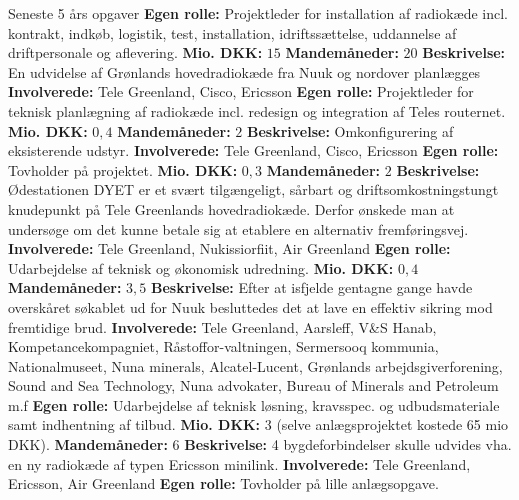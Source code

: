 \begin{rubric}{Seneste 5 års opgaver}
\entry* \textbf{Egen rolle:} Projektleder for installation af radiokæde incl. kontrakt, indkøb, logistik, test, installation, idriftssættelse, uddannelse af driftpersonale og aflevering.
\entry* \textbf{Mio. DKK:} $15$
\entry* \textbf{Mandemåneder:} $20$
%
 \textbf{Beskrivelse:} En udvidelse af Grønlands hovedradiokæde fra Nuuk og nordover planlægges
\entry* \textbf{Involverede:} Tele Greenland, Cisco, Ericsson
\entry* \textbf{Egen rolle:} Projektleder for teknisk planlægning af radiokæde incl. redesign og integration af Teles routernet.
\entry* \textbf{Mio. DKK:} $0,4$
\entry* \textbf{Mandemåneder:} $2$
%
 \textbf{Beskrivelse:} Omkonfigurering af eksisterende udstyr.
\entry* \textbf{Involverede:} Tele Greenland, Cisco, Ericsson
\entry* \textbf{Egen rolle:} Tovholder på projektet.
\entry* \textbf{Mio. DKK:} $0,3$
\entry* \textbf{Mandemåneder:} $2$
%
 \textbf{Beskrivelse:} Ødestationen DYET er et svært tilgængeligt, sårbart og driftsomkostningstungt knudepunkt på Tele Greenlands hovedradiokæde. Derfor ønskede man at undersøge om det kunne betale sig at etablere en alternativ fremføringsvej.
\entry* \textbf{Involverede:} Tele Greenland, Nukissiorfiit, Air Greenland
\entry* \textbf{Egen rolle:} Udarbejdelse af teknisk og økonomisk udredning.
\entry* \textbf{Mio. DKK:} $0,4$
\entry* \textbf{Mandemåneder:} $3,5$
%
 \textbf{Beskrivelse:} Efter at isfjelde gentagne gange havde overskåret søkablet ud for Nuuk besluttedes det at lave en effektiv sikring mod fremtidige brud.
\entry* \textbf{Involverede:} Tele Greenland, Aarsleff, V\&S Hanab, Kompetancekompagniet, Råstoffor-valtningen, Sermersooq kommunia, Nationalmuseet, Nuna minerals, Alcatel-Lucent, Grønlands arbejdsgiverforening, Sound and Sea Technology, Nuna advokater, Bureau of Minerals and Petroleum m.f
\entry* \textbf{Egen rolle:} Udarbejdelse af teknisk løsning, kravsspec. og udbudsmateriale samt indhentning af tilbud. 
\entry* \textbf{Mio. DKK:} $3$ (selve anlægsprojektet kostede 65 mio DKK).
\entry* \textbf{Mandemåneder:} $6$
%
 \textbf{Beskrivelse:} 4 bygdeforbindelser skulle udvides vha. en ny radiokæde af typen Ericsson minilink.
\entry* \textbf{Involverede:} Tele Greenland, Ericsson, Air Greenland
\entry* \textbf{Egen rolle:} Tovholder på lille anlægsopgave.

\end{rubric}
